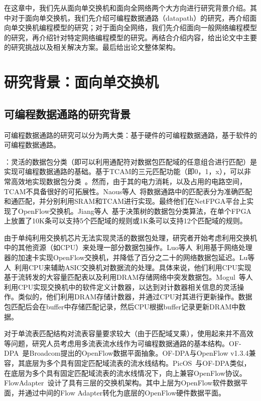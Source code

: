 \documentclass{ctexart}
\newcommand{\para}[1]{\smallskip\noindent {\bf #1}}
\begin{document}
在这章中，我们先从面向单交换机和面向全网络两个大方向进行研究背景介绍。其中对于面向单交换机，我们先介绍可编程数据通路（datapath）的研究，再介绍面向单交换机编程模型的研究；对于面向全网络，我们先介绍面向一般网络编程模型的研究，再介绍针对特定网络编程模型的研究。再结合介绍内容，给出论文中主要的研究挑战以及相关解决方案。最后给出论文整体架构。


\section{研究背景：面向单交换机}

\subsection{可编程数据通路的研究背景}

可编程数据通路的研究可以分为两大类：基于硬件的可编程数据通路，基于软件的可编程数据通路。

\para{基于硬件的可编程数据通路}：灵活的数据包分类（即可以利用通配符对数据包匹配域的任意组合进行匹配）是实现可编程数据通路的基础。基于TCAM的三元匹配功能（即0，1，x），可以非常高效地实现数据包分类~\cite{yu2005efficient,lakshminarayanan2005algorithms,song2005efficient}。然而，由于其的电力消耗，以及占用的电路空间，TCAM不具备很好的可拓展性。Naous等人~\cite{naous2008implementing}将数据通路中的匹配表分为准确匹配和通匹配，并分别利用SRAM和TCAM进行实现。最终他们在NetFPGA平台上实现了OpenFlow交换机。Jiang等人~\cite{jiang2011scalable}基于决策树的数据包分类算法，在单个FPGA上放置了10K条可以支持5个匹配域的规则或1K条可以支持12个匹配域的规则。

由于单纯利用交换机芯片无法实现灵活的数据包处理，研究者开始考虑利用交换机中的其他资源（如CPU）来处理一部分数据包操作。Luo等人~\cite{luo2009accelerating}利用基于网络处理器的加速卡实现OpenFlow交换机，并降低了百分之二十的网络数据包延迟。Lu等人~\cite{lu2012using}利用CPU来辅助ASIC交换机对数据流的处理。具体来说，他们利用CPU实现基于流转发的大容量匹配表以及利用DRAM存储网络中突发数据包。Mogul~\cite{mogul2012hey}等人利用CPU实现交换机中的软件定义计数器，以达到对计数器相关信息的灵活操作。类似的，他们利用DRAM存储计数器，并通过CPU对其进行更新操作。数据包匹配后会在buffer中存储匹配记录，然后CPU根据buffer记录更新DRAM中数据。

对于单流表匹配结构对流表容量要求较大（由于匹配域叉乘），使用起来并不高效等问题，研究人员考虑用多流表流水线作为可编程数据通路的基本结构。OF-DPA~\cite{OF-DPA}是Broadcom提出的OpenFlow数据平面抽象。OF-DPA与OpenFlow v1.3.4兼容，其底层为多个具有固定匹配域流表的流水线结构。PicOS~\cite{PicOS}与OF-DPA类似，在底层为多个具有固定匹配域流表的流水线情况下，向上兼容OpenFlow协议。FlowAdapter~\cite{pan2013flowadapter}设计了具有三层的交换机架构。其中上层为OpenFlow软件数据平面，并通过中间的Flow Adapter转化为底层的OpenFlow硬件数据平面。
\end{document}

